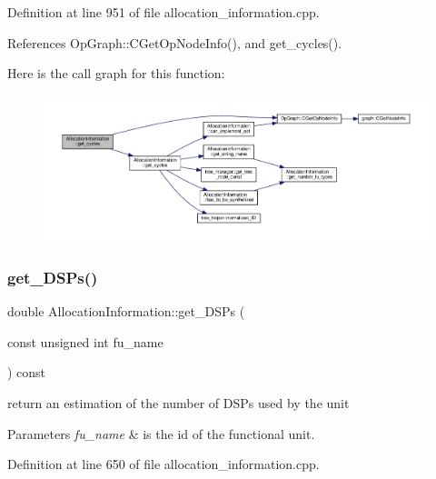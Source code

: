 Definition at line 951 of file allocation\+\_\+information.\+cpp.



References Op\+Graph\+::\+C\+Get\+Op\+Node\+Info(), and get\+\_\+cycles().

Here is the call graph for this function\+:
\nopagebreak
\begin{figure}[H]
\begin{center}
\leavevmode
\includegraphics[width=350pt]{d7/d79/classAllocationInformation_a27fb75577efef8e25dd62117e745a0a0_cgraph}
\end{center}
\end{figure}
\mbox{\label{classAllocationInformation_a82d30f63d76245714b5a3b6a805d8aaf}} 
\subsubsection{\texorpdfstring{get\+\_\+\+D\+S\+Ps()}{get\_DSPs()}}
{\footnotesize\ttfamily double Allocation\+Information\+::get\+\_\+\+D\+S\+Ps (\begin{DoxyParamCaption}\item[{const unsigned int}]{fu\+\_\+name }\end{DoxyParamCaption}) const}



return an estimation of the number of D\+S\+Ps used by the unit 


\begin{DoxyParams}{Parameters}
{\em fu\+\_\+name} & is the id of the functional unit. \\
\hline
\end{DoxyParams}


Definition at line 650 of file allocation\+\_\+information.\+cpp.



